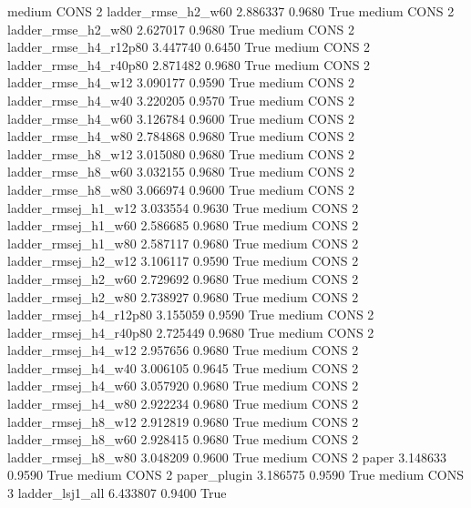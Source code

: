     medium     CONS                 2     ladder_rmse_h2_w60   2.886337      0.9680    True
    medium     CONS                 2     ladder_rmse_h2_w80   2.627017      0.9680    True
    medium     CONS                 2  ladder_rmse_h4_r12p80   3.447740      0.6450    True
    medium     CONS                 2  ladder_rmse_h4_r40p80   2.871482      0.9680    True
    medium     CONS                 2     ladder_rmse_h4_w12   3.090177      0.9590    True
    medium     CONS                 2     ladder_rmse_h4_w40   3.220205      0.9570    True
    medium     CONS                 2     ladder_rmse_h4_w60   3.126784      0.9600    True
    medium     CONS                 2     ladder_rmse_h4_w80   2.784868      0.9680    True
    medium     CONS                 2     ladder_rmse_h8_w12   3.015080      0.9680    True
    medium     CONS                 2     ladder_rmse_h8_w60   3.032155      0.9680    True
    medium     CONS                 2     ladder_rmse_h8_w80   3.066974      0.9600    True
    medium     CONS                 2    ladder_rmsej_h1_w12   3.033554      0.9630    True
    medium     CONS                 2    ladder_rmsej_h1_w60   2.586685      0.9680    True
    medium     CONS                 2    ladder_rmsej_h1_w80   2.587117      0.9680    True
    medium     CONS                 2    ladder_rmsej_h2_w12   3.106117      0.9590    True
    medium     CONS                 2    ladder_rmsej_h2_w60   2.729692      0.9680    True
    medium     CONS                 2    ladder_rmsej_h2_w80   2.738927      0.9680    True
    medium     CONS                 2 ladder_rmsej_h4_r12p80   3.155059      0.9590    True
    medium     CONS                 2 ladder_rmsej_h4_r40p80   2.725449      0.9680    True
    medium     CONS                 2    ladder_rmsej_h4_w12   2.957656      0.9680    True
    medium     CONS                 2    ladder_rmsej_h4_w40   3.006105      0.9645    True
    medium     CONS                 2    ladder_rmsej_h4_w60   3.057920      0.9680    True
    medium     CONS                 2    ladder_rmsej_h4_w80   2.922234      0.9680    True
    medium     CONS                 2    ladder_rmsej_h8_w12   2.912819      0.9680    True
    medium     CONS                 2    ladder_rmsej_h8_w60   2.928415      0.9680    True
    medium     CONS                 2    ladder_rmsej_h8_w80   3.048209      0.9600    True
    medium     CONS                 2                  paper   3.148633      0.9590    True
    medium     CONS                 2           paper_plugin   3.186575      0.9590    True
    medium     CONS                 3        ladder_lsj1_all   6.433807      0.9400    True
